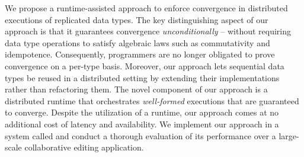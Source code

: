 We propose a runtime-assisted approach to enforce convergence in distributed executions of replicated data types. The key distinguishing aspect of our approach is that it guarantees convergence \emph{unconditionally} -- without requiring data type operations to satisfy algebraic laws such as commutativity and idempotence. Consequently, programmers are no longer obligated to prove convergence on a per-type basis. Moreover, our approach lets sequential data types be reused in a distributed setting by extending their implementations rather than refactoring them.  The novel component of our approach is a distributed runtime that orchestrates \emph{well-formed } executions that are guaranteed to converge. Despite the utilization of a runtime, our approach comes at no additional cost of latency and availability. We implement our approach in a system called \quark and conduct a thorough evaluation of its performance over a large-scale collaborative editing application. 
